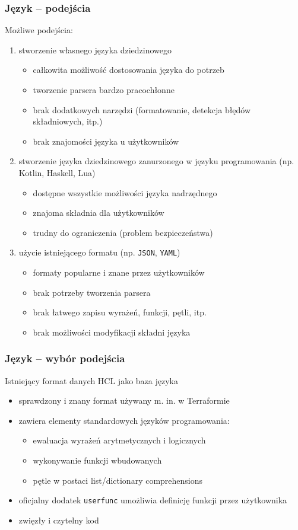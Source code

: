 \documentclass{beamer}
\newcommand\pro{\item[$+$]}
\newcommand\con{\item[$-$]}
\begin{document}
\begin{frame}[allowframebreaks]
	\frametitle{Język -- podejścia}
	Możliwe podejścia:
	\begin{enumerate}
		\item stworzenie własnego języka dziedzinowego
		      \begin{itemize}
			      \pro całkowita możliwość dostosowania języka do potrzeb
			      \con tworzenie parsera bardzo pracochłonne
			      \con brak dodatkowych narzędzi (formatowanie, detekcja błędów składniowych, itp.)
			      \con brak znajomości języka u użytkowników
		      \end{itemize}
		\item stworzenie języka dziedzinowego zanurzonego w języku programowania (np. Kotlin, Haskell, Lua)
		      \begin{itemize}
			      \pro dostępne wszystkie możliwości języka nadrzędnego
			      \pro znajoma składnia dla użytkowników
			      \con trudny do ograniczenia (problem bezpieczeństwa)
		      \end{itemize}
		      \framebreak
		\item użycie istniejącego formatu (np. {\tt JSON}, {\tt YAML})
		      \begin{itemize}
			      \pro formaty popularne i znane przez użytkowników
			      \pro brak potrzeby tworzenia parsera
			      \con brak łatwego zapisu wyrażeń, funkcji, pętli, itp.
			      \con brak możliwości modyfikacji składni języka
		      \end{itemize}
	\end{enumerate}
\end{frame}

\begin{frame}
	\frametitle{Język -- wybór podejścia}
	Istniejący format danych HCL jako baza języka
	\begin{itemize}
		\item sprawdzony i znany format używany m. in. w Terraformie\footnotemark
		\item zawiera elementy standardowych języków programowania:
		      \begin{itemize}
			      \item ewaluacja wyrażeń arytmetycznych i logicznych
			      \item wykonywanie funkcji wbudowanych
			      \item pętle w postaci list/dictionary comprehensions
		      \end{itemize}
		\item oficjalny dodatek {\tt userfunc} umożliwia definicję funkcji przez użytkownika
		\item zwięzły i czytelny kod
	\end{itemize}
\end{frame}
\end{document}
